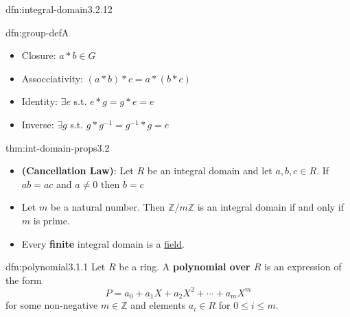 \documentclass[landscape, 8pt]{extarticle}
\begin{document}
\begin{multicols}{3}
\begin{multicols}{2}
\begin{sdfn}{dfn:integral-domain}{3.2.12}
    \end{sdfn}

    \columnbreak

    \begin{rcl}[Group]{dfn:group-def}{A}
        \begin{itemize}[leftmargin=*]
            \setlength\itemsep{0em}
            \item Closure: $a*b\in G$
            \item Assocciativity: $(a * b) * c = a * (b * c)$
            \item Identity: $\exists e$ s.t. $e*g=g*e=e$
            \item Inverse: $\exists g$ s.t. $g*g^{-1}=g^{-1}*g=e$
        \end{itemize}
    \end{rcl}
\end{multicols}

\vspace{-14pt}
\begin{thm}{thm:int-domain-props}{3.2}
    \vspace{-5pt}
    \begin{itemize}
        \setlength\itemsep{0em}
        \item[\textbf{3.2.15}] \textbf{(Cancellation Law)}: Let $R$ be an integral domain and let $a,b,c\in R$. If $ab = ac$ and $a\ne 0$ then $b = c$
        \item[\textbf{3.2.16}] Let $m$ be a natural number. Then $\mathbb{Z} / m\mathbb{Z}$ is an integral domain if and only if $m$ is prime.
        \item[\textbf{3.2.17}] Every \textbf{finite} integral domain is a \hyperref[dfn:fields-and-rings]{field}.
    \end{itemize}
    
    
\end{thm}

\vspace{-5pt}
\begin{dfn}[Polynomial]{dfn:polynomial}{3.1.1}
    \vspace{-5pt}
    Let $R$ be a ring. A \textbf{polynomial over $R$} is an expression of the form
    \[P = a_{0} + a_{1}X + a_{2}X^{2} + \cdots + a_{m}X^{m}\]
    for some non-negative $m\in \mathbb{Z}$ and elements $a_{i}\in R$ for $0 \le i \le m$. 


\end{dfn}
\end{multicols}
\end{document}
